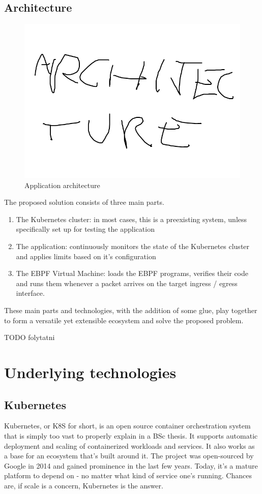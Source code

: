\subsection{Architecture}
\begin{figure}[H]
	\centering
	\includegraphics[width=\textwidth]{images/archi.png}
	\caption{Application architecture}
	\label{fig:app-arch-impl}
\end{figure}
\noindent
The proposed solution consists of three main parts.
\begin{enumerate}
	\item The Kubernetes cluster: in most cases, this is a preexisting system, unless specifically set up for testing the application
	\item The application: continuously monitors the state of the Kubernetes cluster and applies limits based on it's configuration
	\item The EBPF Virtual Machine: loads the EBPF programs, verifies their code and runs them whenever a packet arrives on the target ingress / egress interface.
\end{enumerate}

These main parts and technologies, with the addition of some glue, play together to form a versatile yet extensible ecosystem and solve the proposed problem.

TODO folytatni

\newpage
\section{Underlying technologies}
\subsection{Kubernetes}
Kubernetes, or K8S for short, is an open source container orchestration system that is simply too vast to properly explain in a BSc thesis. It supports automatic deployment and scaling of containerized workloads and services. It also works as a base for an ecosystem that's built around it. The project was open-sourced by Google\cite{google} in 2014 and gained prominence in the last few years. Today, it's a mature platform to depend on - no matter what kind of service one's running. Chances are, if scale is a concern, Kubernetes is the answer.

